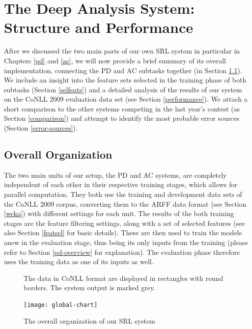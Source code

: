 \documentclass[12pt,notitlepage]{report}
\begin{document}
%
%
\chapter{The Deep Analysis System: Structure and Performance}\label{setup}
%
%

After we discussed the two main parts of our own SRL system in particular in Chapters \ref{pd} and \ref{ac}, we will now provide a brief summary of its overall implementation, connecting the PD and AC subtasks together (in Section \ref{overall}). We include an insight into the feature sets selected in the training phase of both subtasks (Section \ref{selfeats}) and a detailed analysis of the results of our system on the CoNLL 2009 evaluation data set (see Section \ref{performance}). We attach a short comparison to the other systems competing in the last year's contest (as Section \ref{comparison}) and attempt to identify the most probable error sources (Section \ref{error-sources}).

\section{Overall Organization}\label{overall}

The two main units of our setup, the PD and AC systems, are completely independent of each other in their respective training stages, which allows for parallel computation. They both use the training and development data sets of the CoNLL 2009 corpus, converting them to the ARFF data format (see Section \ref{weka}) with different settings for each unit. The results of the both training stages are the feature filtering settings, along with a set of selected features (see also Section \ref{featsel} for basic details). These are then used to train the models anew in the evaluation stage, thus being its only inputs from the training (please refer to Section \ref{pd-overview} for explanation). The evaluation phase therefore uses the training data as one of its inputs as well.

\begin{figure}[htb]\footnotesize
\caption{The overall organization of our SRL system}\label{fig:overall}
\noindent The data in CoNLL format are displayed in rectangles with round borders. The system output is marked grey.
\begin{center}
\texttt{[image: global-chart]}
\end{center}
\end{figure}
\end{document}
